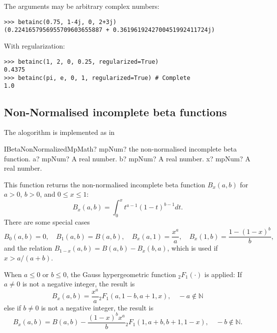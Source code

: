 The arguments may be arbitrary complex numbers:

\begin{lstlisting}
>>> betainc(0.75, 1-4j, 0, 2+3j)
(0.2241657956955709603655887 + 0.3619619242700451992411724j)
\end{lstlisting}

With regularization:

\begin{lstlisting}
>>> betainc(1, 2, 0, 0.25, regularized=True)
0.4375
>>> betainc(pi, e, 0, 1, regularized=True) # Complete
1.0
\end{lstlisting}






\subsection{Non-Normalised incomplete beta functions}


The alogorithm is implemented as in \cite{DiDonato_1987}



\begin{mpFunctionsExtract}
	\mpFunctionThreeNotImplemented
	{IBetaNonNormalizedMpMath? mpNum? the non-normalised incomplete beta function.}
	{a? mpNum? A real number.}
	{b? mpNum? A real number.}
	{x? mpNum? A real number.}
\end{mpFunctionsExtract}

\vspace{0.3cm}
This function returns the non-normalised incomplete beta function $B_x(a,b)$ for $a>0$, $b>0$, and $0 \leq x \leq 1$:
\begin{equation}
	B_x(a,b) = \int_0^x t^{a-1} (1-t)^{b-1} dt.
\end{equation}
There are some special cases
\begin{equation}
	B_0(a,b)=0, \quad B_1(a,b)=B(a,b), \quad B_x(a,1)= \frac{x^a}{a}, \quad B_x(1,b)= \frac{1-(1-x)^b}{b},
\end{equation}
and the relation $B_{1-x}(a,b)=B(a,b)-B_x(b,a)$, which is used if $x>a/(a+b)$. 

\vspace{0.3cm}
When $a \leq 0$ or $b \leq 0$, the Gauss hypergeometric function ${}_2F_1(\cdot)$ is applied: If $a \neq 0$ is not a negative integer, the result is
\begin{equation}
	B_x(a,b)=\frac{x^a}{a} {}_2F_1(a,1-b,a+1,x), \quad -a \notin \mathbb{N}
\end{equation}
else if $b \neq 0$  is not a negative integer, the result is
\begin{equation}
	B_x(a,b)=B(a,b) - \frac{(1-x)^b x^a}{b} {}_2F_1(1,a+b,b+1,1-x), \quad -b \notin \mathbb{N}.
\end{equation}



